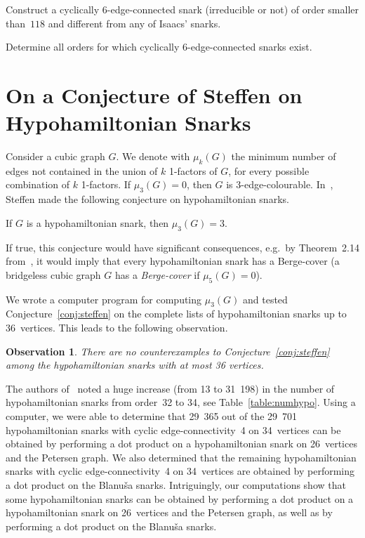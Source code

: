 \documentclass{amcjoucc}
\newtheorem{observation}[thm]{Observation}
\begin{document}
\begin{problem}
Construct a cyclically $6$-edge-connected snark (irreducible or not) of order smaller than~$118$ and different from any of Isaacs' snarks.
\end{problem}

\begin{problem}
Determine all orders for which cyclically $6$-edge-connected snarks exist.
\end{problem}




\section{On a Conjecture of Steffen on Hypohamiltonian Snarks}
\label{sect:conjecture_steffen}

Consider a cubic graph $G$. We denote with $\mu_k(G)$ the minimum number of edges not contained in the union of $k$ 1-factors of $G$, for every possible combination of $k$ 1-factors. If $\mu_3(G) = 0$, then $G$ is 3-edge-colourable. In~\cite{steffen20151}, Steffen made the following conjecture on hypohamiltonian snarks.


\begin{conjecture}\label{conj:steffen}
If $G$ is a hypohamiltonian snark, then $\mu_3(G) = 3$.
\end{conjecture}

If true, this conjecture would have significant consequences, e.g.\ by Theorem~2.14 from~\cite{steffen20151}, it would imply that every hypohamiltonian snark has a Berge-cover (a bridgeless cubic graph $G$ has a \emph{Berge-cover} if $\mu_5(G) = 0$).

We wrote a computer program for computing $\mu_3(G)$ and tested Conjecture~\ref{conj:steffen} on the complete lists of hypohamiltonian snarks up to 36~vertices. This leads to the following observation.

\begin{observation}
There are no counterexamples to Conjecture~\ref{conj:steffen} among the hypohamiltonian snarks with at most 36 vertices.
\end{observation}



The authors of~\cite{BGHM13} noted a huge increase (from 13 to 31~198) in the number of hypohamiltonian snarks from order~32 to 34, see Table~\ref{table:numhypo}. Using a computer, we were able to determine that 29~365 out of the 29~701 hypohamiltonian snarks with cyclic edge-connectivity~4 on 34~vertices can be obtained by performing a dot product on a hypohamiltonian snark on 26~vertices and the Petersen graph. We also determined that the remaining hypohamiltonian snarks with cyclic edge-connectivity~4 on 34~vertices are obtained by performing a dot product on the Blanu\v{s}a snarks. Intriguingly, our computations show that some hypohamiltonian snarks can be obtained by performing a dot product on a hypohamiltonian snark on 26~vertices and the Petersen graph, as well as by performing a dot product on the Blanu\v{s}a snarks.
\end{document}
